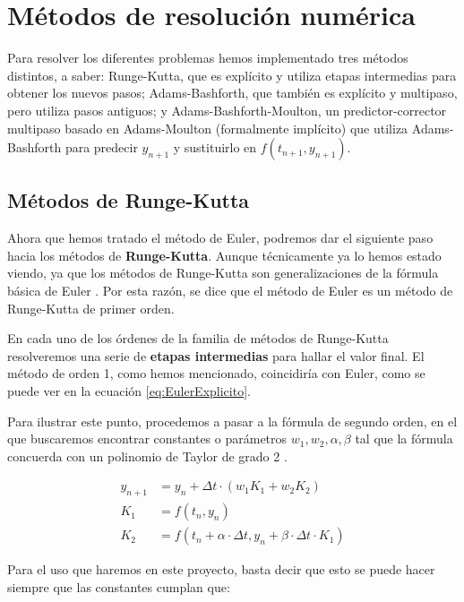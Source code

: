 \clearpage

\section{Métodos de resolución numérica}
Para resolver los diferentes problemas hemos implementado tres métodos distintos, a saber: Runge-Kutta, que es explícito y utiliza etapas intermedias para obtener los nuevos pasos; Adams-Bashforth, que también es explícito y multipaso, pero utiliza pasos antiguos; y Adams-Bashforth-Moulton, un predictor-corrector multipaso basado en Adams-Moulton (formalmente implícito) que utiliza Adams-Bashforth para predecir $y_{n+1}$ y sustituirlo en $f(t_{n+1}, y_{n+1})$.


\subsection{Métodos de Runge-Kutta}

Ahora que hemos tratado el método de Euler, podremos dar el siguiente paso hacia los métodos de \textbf{Runge-Kutta}. Aunque técnicamente ya lo hemos estado viendo, ya que los métodos de Runge-Kutta son generalizaciones de la fórmula básica de Euler \cite{Segarra-Escandon2020}. Por esta razón, se dice que el método de Euler es un método de Runge-Kutta de primer orden.

En cada uno de los órdenes de la familia de métodos de Runge-Kutta resolveremos una serie de \textbf{etapas intermedias} para hallar el valor final. El método de orden 1, como hemos mencionado, coincidiría con Euler, como se puede ver en la ecuación \ref{eq:EulerExplicito}.

Para ilustrar este punto, procedemos a pasar a la fórmula de segundo orden, en el que buscaremos encontrar constantes o parámetros $w_1, w_2, \alpha, \beta$ tal que la fórmula concuerda con un polinomio de Taylor de grado 2 \cite{Zill2009}.

\begin{equation}
	\label{eq:RungeKutta2Inicial}
	\begin{split}
		y_{n+1} &= y_n + \Delta t \cdot (w_1 K_1 + w_2 K_2)\\
			K_1 &= f(t_n, y_n)\\
			K_2 &= f(t_n + \alpha \cdot \Delta t, y_n + \beta \cdot \Delta t \cdot K_1)
	\end{split}
\end{equation}

Para el uso que haremos en este proyecto, basta decir que esto se puede hacer siempre que las constantes cumplan que:

